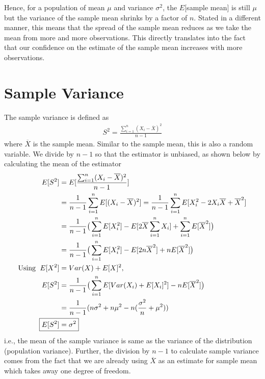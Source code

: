 \documentclass[../probability-notes.tex]{subfiles}
\begin{document}
    Hence, for a population of mean $\mu$ and variance $\sigma^{2}$, the $E[$sample mean$]$ is still $\mu$ but the variance of the sample mean shrinks by a factor of $n$. Stated in a different manner, this means that the spread of the sample mean reduces as we take the mean from more and more observations. This directly translates into the fact that our confidence on the estimate of the sample mean increases with more observations.\newline

    \section{Sample Variance}
    The sample variance is defined as
    \begin{align*}
        S^{2} = \frac{\sum_{i=1}^{n} (X_{i} - \overline{X})^{2}}{n - 1}
    \end{align*}
    where $\overline{X}$ is the sample mean. Similar to the sample mean, this is also a random variable. We divide by $n-1$ so that the estimator is unbiased, as shown below by calculating the mean of the estimator
    \begin{align*}
        E[S^{2}] &= E[\frac{\sum_{i=1}^{n} (X_{i} - \overline{X})^{2}}{n - 1}]\\
        &= \frac{1}{n-1} \sum_{i=1}^{n} E[(X_{i} - \overline{X})^{2}]
        = \frac{1}{n-1} \sum_{i=1}^{n} E[X_{i}^{2} - 2X_{i} \overline{X} + \overline{X}^{2}]\\
        &= \frac{1}{n-1} \big( \sum_{i=1}^{n} E[X_{i}^{2}] - E[2\overline{X} \sum_{i=1}^{n}X_{i}] + \sum_{i=1}^{n}E[\overline{X}^{2}] \big)\\
        &= \frac{1}{n-1} \big( \sum_{i=1}^{n} E[X_{i}^{2}] - E[2n\overline{X}^{2}] + nE[\overline{X}^{2}] \big)\\
        \text{Using \;} E[X^{2}] &= Var(X) + E[X]^{2},\\
        E[S^{2}] &= \frac{1}{n-1} \big( \sum_{i=1}^{n} E[Var(X_{i}) + E[X_{i}]^{2}] - nE[\overline{X}^{2}] \big)\\
        &= \frac{1}{n-1}(n\sigma^{2} + n\mu^{2} - n(\frac{\sigma^{2}}{n} + \mu^{2}))\\
        \Aboxed{E[S^{2}] &= \sigma^{2}}
    \end{align*}
    i.e., the mean of the sample variance is same as the variance of the distribution (population variance). Further, the division by $n-1$ to calculate sample variance comes from the fact that we are already using $\overline{X}$ as an estimate for sample mean which takes away one degree of freedom.
\end{document}
